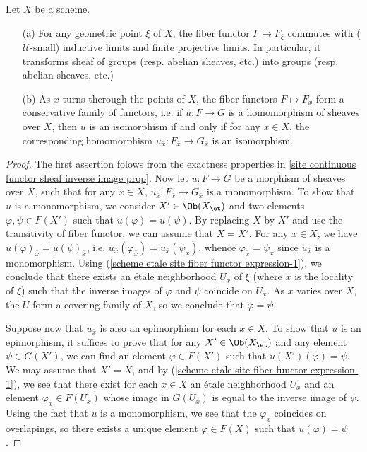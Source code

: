 \begin{theorem}\label{scheme etale site fiber functor conservative}
Let $X$ be a scheme.
\begin{enumerate}
    \item[(a)] For any geometric point $\xi$ of $X$, the fiber functor $F\mapsto F_\xi$ commutes with ($\mathscr{U}$-small) inductive limits and finite projective limits. In particular, it transforms sheaf of groups (resp. abelian sheaves, etc.) into groups (resp. abelian sheaves, etc.)
    \item[(b)] As $x$ turns therough the points of $X$, the fiber functors $F\mapsto F_{\bar{x}}$ form a conservative family of functors, i.e. if $u:F\to G$ is a homomorphism of sheaves over $X$, then $u$ is an isomorphism if and only if for any $x\in X$, the corresponding homomorphism $u_{\bar{x}}:F_{\bar{x}}\to G_{\bar{x}}$ is an isomorphism.
\end{enumerate}
\end{theorem}
\begin{proof}
The first assertion folows from the exactness properties in \ref{site continuous functor sheaf inverse image prop}. Now let $u:F\to G$ be a morphism of sheaves over $X$, such that for any $x\in X$, $u_{\bar{x}}:F_{\bar{x}}\to G_{\bar{x}}$ is a monomorphism. To show that $u$ is a monomorphism, we consider $X'\in\Ob(X_\et)$ and two elements $\varphi,\psi\in F(X')$ such that $u(\varphi)=u(\psi)$. By replacing $X$ by $X'$ and use the transitivity of fiber functor, we can assume that $X=X'$. For any $x\in X$, we have $u(\varphi)_{\bar{x}}=u(\psi)_{\bar{x}}$, i.e. $u_{\bar{x}}(\varphi_{\bar{x}})=u_{\bar{x}}(\psi_{\bar{x}})$, whence $\varphi_{\bar{x}}=\psi_{\bar{x}}$ since $u_{\bar{x}}$ is a monomorphism. Using (\ref{scheme etale site fiber functor expression-1}), we conclude that there exists an \'etale neighborhood $U_x$ of $\xi$ (where $x$ is the locality of $\xi$) such that the inverse images of $\varphi$ and $\psi$ coincide on $U_x$. As $x$ varies over $X$, the $U$ form a covering family of $X$, so we conclude that $\varphi=\psi$.\par
Suppose now that $u_{\bar{x}}$ is also an epimorphism for each $x\in X$. To show that $u$ is an epimorphism, it suffices to prove that for any $X'\in\Ob(X_\et)$ and any element $\psi\in G(X')$, we can find an element $\varphi\in F(X')$ such that $u(X')(\varphi)=\psi$. We may assume that $X'=X$, and by (\ref{scheme etale site fiber functor expression-1}), we see that there exist for each $x\in X$ an \'etale neighborhood $U_x$ and an element $\varphi_x\in F(U_x)$ whose image in $G(U_x)$ is equal to the inverse image of $\psi$. Using the fact that $u$ is a monomorphism, we see that the $\varphi_x$ coincides on overlapings, so there exists a unique element $\varphi\in F(X)$ such that $u(\varphi)=\psi$.
\end{proof}

